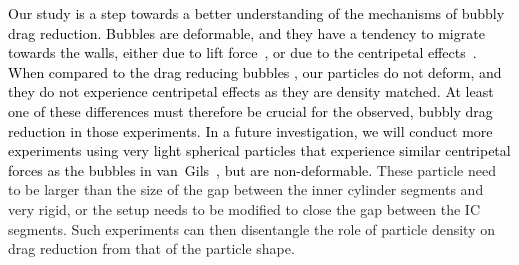 \textcolor{black}{Our study is a step towards a better understanding of the
mechanisms of bubbly drag reduction. Bubbles are deformable, and they have
a tendency to migrate towards the walls, either due to lift
force~\citep{Dabiri2013}, or due to the centripetal
effects~\citep{vanGils2013}. When compared to the drag reducing bubbles 
\citep{vanGils2013,Verschoof2016}, our particles do not deform, and they do
not experience centripetal effects as they are density matched.  At
least one of these differences must therefore be crucial for the observed,
bubbly drag reduction in those experiments.
In a future investigation, we will conduct more experiments using very light
spherical particles that experience similar centripetal forces as the bubbles
in van~Gils~\citep{vanGils2013}, but are non-deformable.} These particle need to be
larger than the size of the gap between the inner cylinder segments and very
rigid, or the setup needs to be modified to close the gap between the IC
segments.  Such experiments can then disentangle the role of particle density
on drag reduction from that of the particle shape.

\graphicspath{{fig/}}


